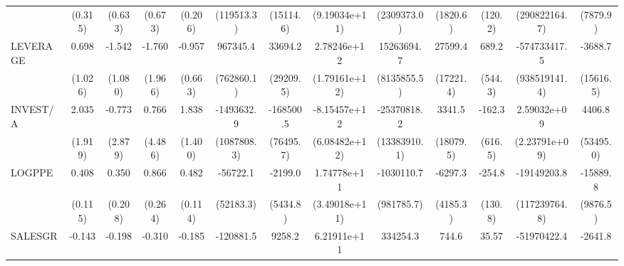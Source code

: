 \begin{table}[htbp]
\begin{tabular}{l*{12}{c}}
                    &     (0.315)         &     (0.633)         &     (0.673)         &     (0.206)         &  (119513.3)         &   (15114.6)         &(9.19034e+11)         & (2309373.0)         &    (1820.6)         &     (120.2)         &(290822164.7)         &    (7879.9)         \\
LEVERAGE            &       0.698         &      -1.542         &      -1.760         &      -0.957         &    967345.4         &     33694.2         & 2.78246e+12         &  15263694.7\sym{*}  &     27599.4         &       689.2         &-574733417.5         &     -3688.7         \\
                    &     (1.026)         &     (1.080)         &     (1.966)         &     (0.663)         &  (762860.1)         &   (29209.5)         &(1.79161e+12)         & (8135855.5)         &   (17221.4)         &     (544.3)         &(938519141.4)         &   (15616.5)         \\
INVEST/A            &       2.035         &      -0.773         &       0.766         &       1.838         &  -1493632.9         &   -168500.5\sym{**} &-8.15457e+12         & -25370818.2\sym{*}  &      3341.5         &      -162.3         & 2.59032e+09         &      4406.8         \\
                    &     (1.919)         &     (2.879)         &     (4.486)         &     (1.400)         & (1087808.3)         &   (76495.7)         &(6.08482e+12)         &(13383910.1)         &   (18079.5)         &     (616.5)         &(2.23791e+09)         &   (53495.0)         \\
LOGPPE              &       0.408\sym{***}&       0.350         &       0.866\sym{***}&       0.482\sym{***}&    -56722.1         &     -2199.0         & 1.74778e+11         &  -1030110.7         &     -6297.3         &      -254.8\sym{*}  & -19149203.8         &    -15889.8         \\
                    &     (0.115)         &     (0.208)         &     (0.264)         &     (0.114)         &   (52183.3)         &    (5434.8)         &(3.49018e+11)         &  (981785.7)         &    (4185.3)         &     (130.8)         &(117239764.8)         &    (9876.5)         \\
SALESGR             &      -0.143         &      -0.198         &      -0.310         &      -0.185\sym{**} &   -120881.5         &      9258.2\sym{*}  & 6.21911e+11         &    334254.3         &       744.6         &       35.57\sym{*}  & -51970422.4         &     -2641.8         \\

\end{tabular}
\end{table}
